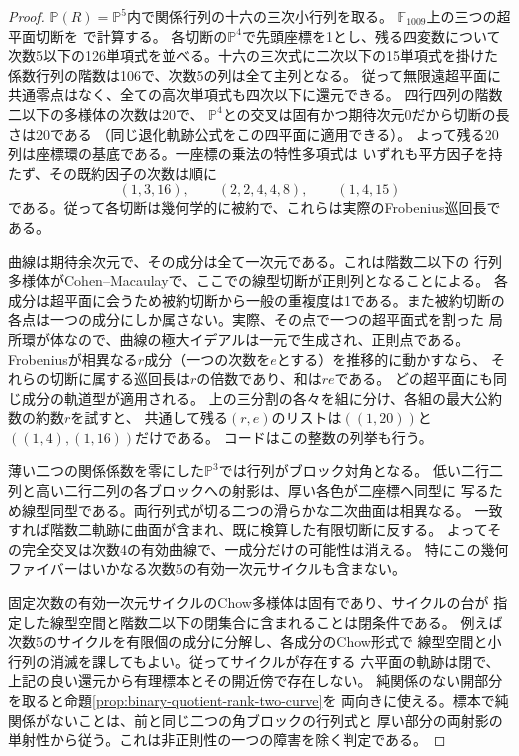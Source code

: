 \begin{proof}
$\mathbb P(R)=\mathbb P^5$内で関係行列の十六の三次小行列を取る。
$\mathbb F_{1009}$上の三つの超平面切断を
で計算する。
各切断の$\mathbb P^4$で先頭座標を1とし、残る四変数について
次数5以下の126単項式を並べる。十六の三次式に二次以下の15単項式を掛けた
係数行列の階数は106で、次数5の列は全て主列となる。
従って無限遠超平面に共通零点はなく、全ての高次単項式も四次以下に還元できる。
四行四列の階数二以下の多様体の次数は20で、
$\mathbb P^4$との交叉は固有かつ期待次元0だから切断の長さは20である
（同じ退化軌跡公式をこの四平面に適用できる）。
よって残る20列は座標環の基底である。一座標の乗法の特性多項式は
いずれも平方因子を持たず、その既約因子の次数は順に
\[
 (1,3,16),\qquad(2,2,4,4,8),\qquad(1,4,15)
\]
である。従って各切断は幾何学的に被約で、これらは実際のFrobenius巡回長である。

曲線は期待余次元で、その成分は全て一次元である。これは階数二以下の
行列多様体がCohen--Macaulayで、ここでの線型切断が正則列となることによる。
各成分は超平面に会うため被約切断から一般の重複度は1である。また被約切断の
各点は一つの成分にしか属さない。実際、その点で一つの超平面式を割った
局所環が体なので、曲線の極大イデアルは一元で生成され、正則点である。
Frobeniusが相異なる$r$成分（一つの次数を$e$とする）を推移的に動かすなら、
それらの切断に属する巡回長は$r$の倍数であり、和は$re$である。
どの超平面にも同じ成分の軌道型が適用される。
上の三分割の各々を組に分け、各組の最大公約数の約数$r$を試すと、
共通して残る$(r,e)$のリストは$((1,20))$と$((1,4),(1,16))$だけである。
コードはこの整数の列挙も行う。

薄い二つの関係係数を零にした$\mathbb P^3$では行列がブロック対角となる。
低い二行二列と高い二行二列の各ブロックへの射影は、厚い各色が二座標へ同型に
写るため線型同型である。両行列式が切る二つの滑らかな二次曲面は相異なる。
一致すれば階数二軌跡に曲面が含まれ、既に検算した有限切断に反する。
よってその完全交叉は次数4の有効曲線で、一成分だけの可能性は消える。
特にこの幾何ファイバーはいかなる次数5の有効一次元サイクルも含まない。

固定次数の有効一次元サイクルのChow多様体は固有であり、サイクルの台が
指定した線型空間と階数二以下の閉集合に含まれることは閉条件である。
例えば次数5のサイクルを有限個の成分に分解し、各成分のChow形式で
線型空間と小行列の消滅を課してもよい。従ってサイクルが存在する
六平面の軌跡は閉で、上記の良い還元から有理標本とその開近傍で存在しない。
純関係のない開部分を取ると命題\ref{prop:binary-quotient-rank-two-curve}を
両向きに使える。標本で純関係がないことは、前と同じ二つの角ブロックの行列式と
厚い部分の両射影の単射性から従う。これは非正則性の一つの障害を除く判定である。
\end{proof}
